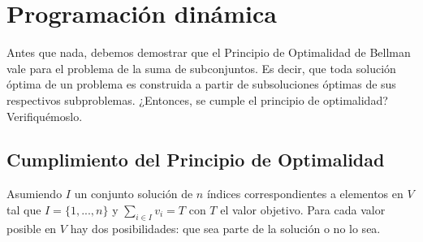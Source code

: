 \section{Programación dinámica}
Antes que nada, debemos demostrar que el Principio de Optimalidad de Bellman vale para el problema de la suma de subconjuntos. Es decir, que toda solución óptima de un problema es construida a partir de subsoluciones óptimas de sus respectivos subproblemas. ¿Entonces, se cumple el principio de optimalidad? Verifiquémoslo.

\subsection{Cumplimiento del Principio de Optimalidad}
Asumiendo $I$ un conjunto solución de $n$ índices correspondientes a elementos en $V$ tal que $I=\{1, ..., n\}$ y $\sum_{i \in I}v_{i} = T$ con $T$ el valor objetivo. Para cada valor posible en $V$ hay dos posibilidades: que sea parte de la solución o no lo sea.

